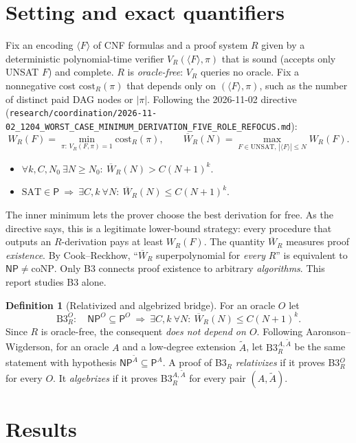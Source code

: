 \documentclass[11pt]{article}
\theoremstyle{definition}
\newtheorem{definition}[theorem]{Definition}
\theoremstyle{remark}
\newcommand{\Wbar}{\overline W}
\newcommand{\NP}{\mathsf{NP}}
\newcommand{\Pc}{\mathsf{P}}
\begin{document}
\section{Setting and exact quantifiers}
Fix an encoding $\langle F\rangle$ of CNF formulas and a proof system $R$ given by a
deterministic polynomial-time verifier $V_R(\langle F\rangle,\pi)$ that is sound
(accepts only UNSAT $F$) and complete. $R$ is \emph{oracle-free}: $V_R$ queries no oracle.
Fix a nonnegative cost $\mathrm{cost}_R(\pi)$ that depends only on $(\langle F\rangle,\pi)$, such as
the number of distinct paid DAG nodes or $|\pi|$. Following the
2026-11-02 directive
(\texttt{research/coordination/2026-11-02\_1204\_WORST\_CASE\_MINIMUM\_DERIVATION\_FIVE\_ROLE\_REFOCUS.md}):
\[
W_R(F)=\min_{\pi:\,V_R(F,\pi)=1}\mathrm{cost}_R(\pi),\qquad
\Wbar_R(N)=\max_{F\in\mathrm{UNSAT},\,|\langle F\rangle|\le N}W_R(F).
\]
\begin{itemize}
\item[LB$_R$:] $\forall k,C,N_0\ \exists N\ge N_0:\ \Wbar_R(N)>C(N+1)^k$.
\item[B3$_R$:] $\mathrm{SAT}\in\Pc\ \Longrightarrow\ \exists C,k\ \forall N:\ \Wbar_R(N)\le C(N+1)^k$.
\end{itemize}
The inner minimum lets the prover choose the best derivation for free. As the directive
says, this is a legitimate lower-bound strategy: every procedure that outputs an
$R$-derivation pays at least $W_R(F)$. The quantity $\Wbar_R$ measures proof
\emph{existence}. By Cook--Reckhow, ``$\Wbar_R$ superpolynomial for \emph{every} $R$''
is equivalent to $\NP\neq\mathrm{coNP}$. Only B3 connects proof existence to
arbitrary \emph{algorithms}. This report studies B3 alone.

\begin{definition}[Relativized and algebrized bridge]
For an oracle $O$ let
\[
\mathrm{B3}_R^{O}:\quad \NP^{O}\subseteq\Pc^{O}\ \Longrightarrow\ \exists C,k\ \forall N:\ \Wbar_R(N)\le C(N+1)^k .
\]
Since $R$ is oracle-free, the consequent \emph{does not depend on $O$}. Following
Aaronson--Wigderson, for an oracle $A$ and a low-degree extension $\tilde A$, let
$\mathrm{B3}_R^{A,\tilde A}$ be the same statement with hypothesis
$\NP^{\tilde A}\subseteq\Pc^{A}$.
A proof of B3$_R$ \emph{relativizes} if it proves B3$_R^{O}$ for every $O$.
It \emph{algebrizes} if it proves B3$_R^{A,\tilde A}$ for every pair $(A,\tilde A)$.
\end{definition}

\section{Results}
\end{document}
